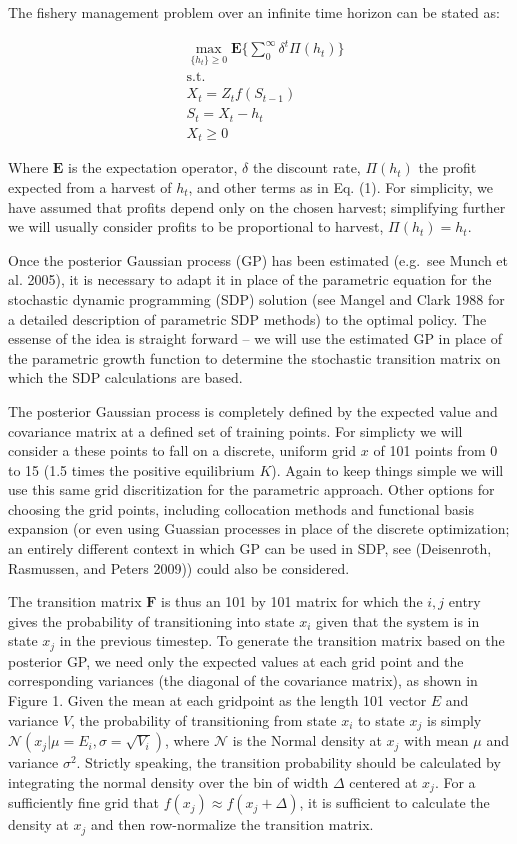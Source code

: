 \documentclass[author-year, review]{elsarticle} %
\begin{document}
The fishery management problem over an infinite time horizon can be
stated as:

\begin{align}
& \max_{ \{h_t\} \geq 0 } \mathbf{E} \lbrace \sum_0^\infty \delta^t \Pi(h_t) \rbrace \\
& \mathrm{s.t.}  \\
 & X_t = Z_t f\left(S_{t-1}\right) \\
 & S_t = X_t - h_t \\
 & X_t  \geq 0 
\end{align}

Where $\mathbf{E}$ is the expectation operator, $\delta$ the discount
rate, $\Pi(h_t)$ the profit expected from a harvest of $h_t$, and other
terms as in Eq. (1). For simplicity, we have assumed that profits depend
only on the chosen harvest; simplifying further we will usually consider
profits to be proportional to harvest, $\Pi(h_t) = h_t$.

Once the posterior Gaussian process (GP) has been estimated (e.g.~see
Munch et al. 2005), it is necessary to adapt it in place of the
parametric equation for the stochastic dynamic programming (SDP)
solution (see Mangel and Clark 1988 for a detailed description of
parametric SDP methods) to the optimal policy. The essense of the idea
is straight forward -- we will use the estimated GP in place of the
parametric growth function to determine the stochastic transition matrix
on which the SDP calculations are based.

The posterior Gaussian process is completely defined by the expected
value and covariance matrix at a defined set of training points. For
simplicty we will consider a these points to fall on a discrete, uniform
grid $x$ of 101 points from 0 to 15 (1.5 times the positive equilibrium
$K$). Again to keep things simple we will use this same grid
discritization for the parametric approach. Other options for choosing
the grid points, including collocation methods and functional basis
expansion (or even using Guassian processes in place of the discrete
optimization; an entirely different context in which GP can be used in
SDP, see (Deisenroth, Rasmussen, and Peters 2009)) could also be
considered.

The transition matrix $\mathbf{F}$ is thus an 101 by 101 matrix for
which the ${i,j}$ entry gives the probability of transitioning into
state $x_i$ given that the system is in state $x_j$ in the previous
timestep. To generate the transition matrix based on the posterior GP,
we need only the expected values at each grid point and the
corresponding variances (the diagonal of the covariance matrix), as
shown in Figure 1. Given the mean at each gridpoint as the length 101
vector $E$ and variance $V$, the probability of transitioning from state
$x_i$ to state $x_j$ is simply
$\mathcal{N}\left(x_j \vert  \mu = E_i, \sigma = \sqrt{V_i}\right)$,
where $\mathcal{N}$ is the Normal density at $x_j$ with mean $\mu$ and
variance $\sigma^2$. Strictly speaking, the transition probability
should be calculated by integrating the normal density over the bin of
width $\Delta$ centered at $x_j$. For a sufficiently fine grid that
$f(x_j) \approx f(x_j + \Delta)$, it is sufficient to calculate the
density at $x_j$ and then row-normalize the transition matrix.
\end{document}

